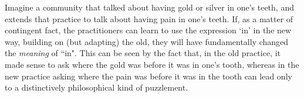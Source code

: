 Imagine a community that talked about having gold or silver in one’s teeth,
and extends that practice to talk about having pain in one’s teeth. If, as a
matter of contingent fact, the practitioners can learn to use the expression
‘in’ in the new way, building on (but adapting) the old, they will have
fundamentally changed the \emph{meaning} of ``in". This can be seen by the
fact that, in the old practice, it made sense to ask where the gold was before
it was in one’s tooth, whereas in the new practice asking where the pain was
before it was in the tooth can lead only to a distinctively philosophical kind
of puzzlement.

\cite{brandom2019some}
